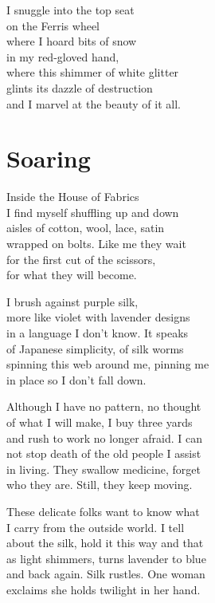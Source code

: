 \documentclass[twoside,10pt]{book}
\begin{document}
I snuggle into the top seat\\
on the Ferris wheel\\
where I hoard bits of snow\\
in my red-gloved hand,\\
where this shimmer of white glitter\\
glints its dazzle of destruction\\
and I marvel at the beauty of it all.


\clearpage
\section{Soaring}

Inside the House of Fabrics\\
I find myself shuffling up and down\\
aisles of cotton, wool, lace, satin\\
wrapped on bolts. Like me they wait\\
for the first cut of the scissors,\\
for what they will become.

I brush against purple silk,\\
more like violet with lavender designs\\
in a language I don't know. It speaks\\
of Japanese simplicity, of silk worms\\
spinning this web around me, pinning me\\
in place so I don't fall down.

Although I have no pattern, no thought\\
of what I will make, I buy three yards\\
and rush to work no longer afraid. I can\\
not stop death of the old people I assist\\
in living. They swallow medicine, forget\\
who they are. Still, they keep moving.

These delicate folks want to know what\\
I carry from the outside world. I tell\\
about the silk, hold it this way and that\\
as light shimmers, turns lavender to blue\\
and back again. Silk rustles. One woman\\
exclaims she holds twilight in her hand.
\end{document}
